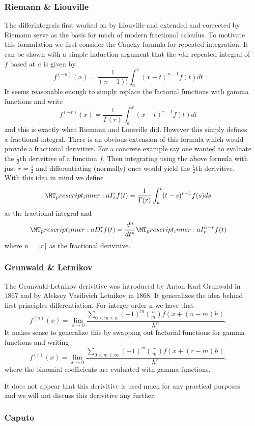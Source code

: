 \documentclass{unswmaths}
\begin{document}
\subsubsection*{Riemann \& Liouville}
The differintegrals first worked on by Liouville and extended and corrected by Riemann serve as the basis for much of modern
fractional calculus. To motivate this formulation we first consider the Cauchy formula for repeated integration. 
It can be shown with a simple induction argument that the $ n$th repeated integral of $ f $ based at $ a $ is given by
$$
    f^{(-n)}(x) = \frac{1}{(n-1)!} \int_a^x (x-t)^{n-1} f(t) dt
$$
It seems reasonable enough to simply replace the factorial functions with gamma functions and write
$$
    f^{(-r)}(x) = \frac{1}{\Gamma(r)} \int_a^x (x-t)^{r-1} f(t) dt
$$
and this is exactly what Riemann and Liouville did. However this simply defines a fractional integral. There is an obvious
extension of this formula which would provide a fractional derivitive. For a concrete example say one wanted to evaluate
the $ \frac{1}{2}$th derivitive of a function $ f $. Then integrating using the above formula with just $ r = \frac{1}{2} $ and
differentiating (normally) once would yield the $\frac{1}{2}$th derivitive. With this idea in mind we define
$$
    \prescript{}{a}{I}_t^r f(t) = \frac{1}{\Gamma(r)} \int_a^t (t-s)^{r-1}f(s) ds
$$
as the fractional integral and
$$
    \prescript{}{a}{D}_t^r f(t) = \frac{d^n}{dt^n} \prescript{}{a}{I}_t^{n-r} f(t)
$$
where $ n = \lceil r \rceil $ as the fractional derivitive.
\subsubsection*{Grunwald \& Letnikov}
The Grunwald-Letnikov derivitive was introduced by Anton Karl Grunwald in 1867 and by Aleksey Vasilivich Letnikov in 1868.
It generalizes the idea behind  first principles differentiation. For integer order n we have that
$$
    f^{(n)}(x) = \lim_{x\longrightarrow0} \frac{\sum_{0\leq m \leq n} (-1)^m \binom{n}{m} f(x + (n-m)h)}{h^n}.
$$
It makes sense to generalize this by swapping out factorial functions for gamma functions and writing
$$
    f^{(r)}(x) = \lim_{x\longrightarrow0} \frac{\sum_{0\leq m \leq \infty} (-1)^m \binom{r}{m} f(x + (r-m)h)}{h^r}.
$$
where the binomial coefficients are evaluated with gamma functions.

It does not appear that this derivitive is used much for any practical purposes and we will not discuss this derivitive any further.
\subsubsection*{Caputo}
\end{document}
